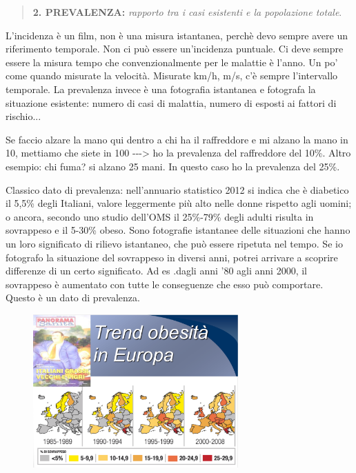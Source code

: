 \begin{quote}
\textbf{2. PREVALENZA:} \emph{rapporto tra i casi esistenti e la
popolazione totale}.
\end{quote}

L'incidenza è un film, non è una misura istantanea, perchè devo sempre
avere un riferimento temporale. Non ci può essere un'incidenza puntuale.
Ci deve sempre essere la misura tempo che convenzionalmente per le
malattie è l'anno. Un po' come quando misurate la velocità. Misurate
km/h, m/s, c'è sempre l'intervallo temporale. La prevalenza invece è una
fotografia istantanea e fotografa la situazione esistente: numero di
casi di malattia, numero di esposti ai fattori di rischio...

Se faccio alzare la mano qui dentro a chi ha il raffreddore e mi alzano
la mano in 10, mettiamo che siete in 100 -\/-\/-\textgreater{} ho la
prevalenza del raffreddore del 10\%. Altro esempio: chi fuma? si alzano
25 mani. In questo caso ho la prevalenza del 25\%.

Classico dato di prevalenza: nell'annuario statistico 2012 si indica che
è diabetico il 5,5\% degli Italiani, valore leggermente più alto nelle
donne rispetto agli uomini; o ancora, secondo uno studio dell'OMS il
25\%-79\% degli adulti risulta in sovrappeso e il 5-30\% obeso. Sono
fotografie istantanee delle situazioni che hanno un loro significato di
rilievo istantaneo, che può essere ripetuta nel tempo. Se io fotografo
la situazione del sovrappeso in diversi anni, potrei arrivare a scoprire
differenze di un certo significato. Ad es .dagli anni '80 agli anni
2000, il sovrappeso è aumentato con tutte le conseguenze che esso può
comportare. Questo è un dato di prevalenza.
\begin{figure}[!ht]
\centering
	\includegraphics[width=0.7\textwidth]{03/image8.png}
\end{figure}

